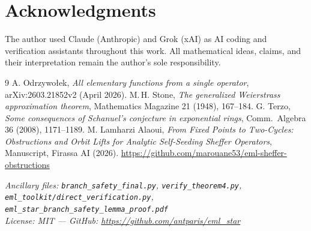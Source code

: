 \documentclass[11pt,a4paper]{article}
\begin{document}
\section*{Acknowledgments}

The author used Claude (Anthropic) and Grok (xAI) as AI coding and verification assistants throughout this work. All mathematical ideas, claims, and their interpretation remain the author's sole responsibility.

\begin{thebibliography}{9}
 A. Odrzywołek, \textit{All elementary functions from a single operator}, arXiv:2603.21852v2 (April 2026).
 M.\,H. Stone, \textit{The generalized Weierstrass approximation theorem}, Mathematics Magazine 21 (1948), 167--184.
 G. Terzo, \textit{Some consequences of Schanuel's conjecture in exponential rings}, Comm.\ Algebra 36 (2008), 1171--1189.
 M. Lamharzi Alaoui, \textit{From Fixed Points to Two-Cycles: Obstructions and Orbit Lifts for Analytic Self-Seeding Sheffer Operators}, Manuscript, Firassa AI (2026). \url{https://github.com/marouane53/eml-sheffer-obstructions}
\end{thebibliography}

\bigskip
\noindent\textit{Ancillary files: \texttt{branch\_safety\_final.py}, \texttt{verify\_theorem4.py}, \texttt{eml\_toolkit/direct\_verification.py}, \texttt{eml\_star\_branch\_safety\_lemma\_proof.pdf}}\\
\noindent\textit{License: MIT --- GitHub: \url{https://github.com/antparis/eml_star}}
\end{document}
